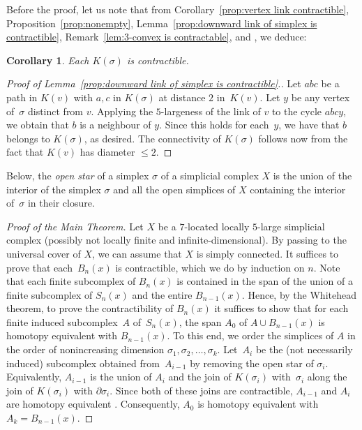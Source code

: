 \documentclass[a4paper,12pt,leqno]{amsart}
\newtheorem{cor}[thm]{Corollary}
\theoremstyle{definition}
\begin{document}
Before the proof, let us note that from Corollary~\ref{prop:vertex link contractible}, Proposition~\ref{prop:nonempty}, Lemma~\ref{prop:downward link of simplex is contractible}, Remark~\ref{lem:3-convex is contractable}, and , we deduce:

\begin{cor} 
\label{cor:main}
Each $K(\sigma)$ is contractible.  
\end{cor}

\begin{proof}[Proof of Lemma~\ref{prop:downward link of simplex is contractible}.]
Let $abc$ be a path in $K(v)$ with $a,c$ in $K(\sigma)$ at distance $2$ in~$K(v)$. Let $y$ be any vertex of~$\sigma$ distinct from $v$. Applying the $5$-largeness of the link of $v$ to the cycle $abcy$, we obtain that $b$ is a neighbour of $y$. Since this holds for each~$y$, we have that $b$ belongs to $K(\sigma)$, as desired. The connectivity of $K(\sigma)$ follows now from the fact that $K(v)$ has diameter $\leq 2$.
\end{proof}

Below, the \emph{open star} of a simplex $\sigma$ of a simplicial complex $X$ is the union of the interior of the simplex $\sigma$ and all the open simplices of $X$ containing the interior of~$\sigma$ in their closure. 

\begin{proof}[Proof of the Main Theorem]
Let $X$ be a $7$-located locally $5$-large simplicial complex (possibly not locally finite and infinite-dimensional). By passing to the universal cover of $X$, we can assume that $X$ is simply connected.
It suffices to prove that each~$B_n(x)$ is contractible, which we do by induction on $n$. 
Note that each finite subcomplex of $B_n(x)$ is contained in the span of the union of a finite subcomplex of $S_n(x)$ and the entire $B_{n-1}(x)$.
Hence, by the Whitehead theorem, to prove the contractibility of $B_n(x)$ it suffices to show that for each finite induced subcomplex~$A$ of~$S_n(x)$, the span $A_0$ of $A\cup B_{n-1}(x)$ is homotopy equivalent with $B_{n-1}(x)$. To this end, we order the simplices of $A$ in the order of nonincreasing dimension $\sigma_1,\sigma_2,\ldots,\sigma_k$. 
Let~$A_i$ be the (not necessarily induced) subcomplex obtained from~$A_{i-1}$ by removing the open star of $\sigma_i$. Equivalently, $A_{i-1}$ is the union of $A_i$ and the join of $K(\sigma_i)$ with~$\sigma_i$ along the join of $K(\sigma_i)$ with $\partial \sigma_i$. Since both of these joins are contractible, $A_{i-1}$ and $A_i$ are homotopy equivalent \cite[Lem~10.3(i)]{Bj}.
Consequently, $A_0$ is homotopy equivalent with $A_k=B_{n-1}(x)$.
\end{proof}
\end{document}
